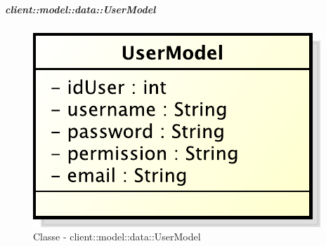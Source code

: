		\subparagraph{client::model::data::UserModel} %
		\label{subp:client_model_data_user}
			\begin{figure}[htbp]
				\centering
				\centerline{\includegraphics[scale=0.7]{./images/client/classes/model/user_model.pdf}}
				\caption{Classe - client::model::data::UserModel}
			\end{figure}
